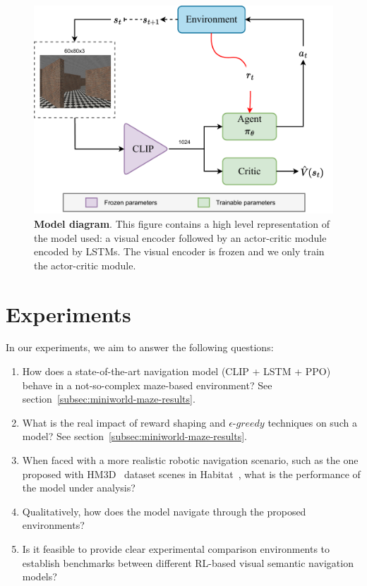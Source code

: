 \begin{figure}[t]
    \centering
    \includegraphics[width=0.8\linewidth]{figures/understanding_vsn/network_clip_diagram}
    \caption{\textbf{Model diagram}. This figure contains a high level representation of the model used: a visual encoder followed by an actor-critic module encoded by LSTMs. The visual encoder is frozen and we only train the actor-critic module.}
    \label{fig:network_clip_diagram}
\end{figure}

\section{Experiments}
\label{sec:experiments}

In our experiments, we aim to answer the following questions:
\begin{enumerate}
    \item How does a state-of-the-art navigation model (CLIP + LSTM + PPO) behave in a not-so-complex maze-based environment?
    See section~\ref{subsec:miniworld-maze-results}.
    \item What is the real impact of reward shaping and $\epsilon\text{-}greedy$ techniques on such a model?
    See section~\ref{subsec:miniworld-maze-results}.
    \item When faced with a more realistic robotic navigation scenario, such as the one proposed with HM3D~\cite{ramakrishnan2021} dataset scenes in Habitat~\cite{szot2021}, what is the performance of the model under analysis?
    \item Qualitatively, how does the model navigate through the proposed environments?
    \item Is it feasible to provide clear experimental comparison environments to establish benchmarks between different RL-based visual semantic navigation models?
\end{enumerate}

